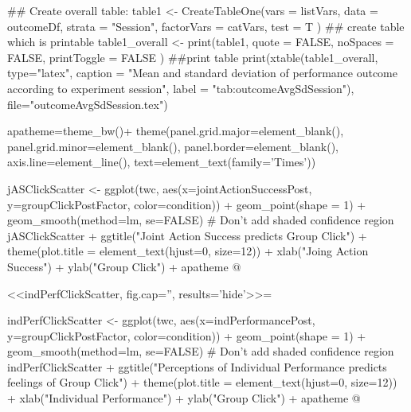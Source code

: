   ## Create overall table:
  table1 <- CreateTableOne(vars = listVars,
                         data = outcomeDf,
                         strata = "Session",
                         factorVars = catVars,
                         test = T
                         )
 ## create table which is printable
 table1_overall <- print(table1,
                             quote = FALSE,
                             noSpaces = FALSE,
                             printToggle = FALSE
                             )
 ##print table
  print(xtable(table1_overall, type="latex",
                         caption = "Mean and standard deviation of performance outcome according to experiment session",
                         label = "tab:outcomeAvgSdSession"),
                         file="outcomeAvgSdSession.tex")




apatheme=theme_bw()+
  theme(panel.grid.major=element_blank(),
        panel.grid.minor=element_blank(),
        panel.border=element_blank(),
        axis.line=element_line(),
        text=element_text(family='Times'))

jASClickScatter <- ggplot(twc, aes(x=jointActionSuccessPost, y=groupClickPostFactor,
                            color=condition)) + geom_point(shape = 1) +
                            geom_smooth(method=lm, se=FALSE)   # Don't add shaded confidence region
jASClickScatter +
            ggtitle("Joint Action Success predicts Group Click") +
            theme(plot.title = element_text(hjust=0, size=12)) +
            xlab("Joing Action Success") +
            ylab("Group Click") +
            apatheme
@

<<indPerfClickScatter, fig.cap='', results='hide'>>=

indPerfClickScatter <- ggplot(twc, aes(x=indPerformancePost, y=groupClickPostFactor,
                            color=condition)) + geom_point(shape = 1) +
                            geom_smooth(method=lm, se=FALSE)   # Don't add shaded confidence region
indPerfClickScatter +
            ggtitle("Perceptions of Individual Performance predicts feelings of Group Click") +
            theme(plot.title = element_text(hjust=0, size=12)) +
            xlab("Individual Performance") +
            ylab("Group Click") +
            apatheme
@


